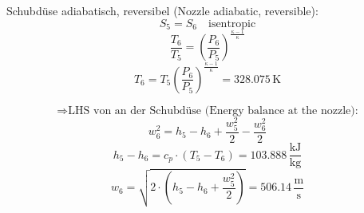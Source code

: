 Schubdüse adiabatisch, reversibel (Nozzle adiabatic, reversible):  
\[
S_5 = S_6 \quad \text{isentropic}
\]  
\[
\frac{T_6}{T_5} = \left(\frac{P_6}{P_5}\right)^{\frac{\kappa - 1}{\kappa}}
\]  
\[
T_6 = T_5 \left(\frac{P_6}{P_5}\right)^{\frac{\kappa - 1}{\kappa}} = 328.075 \, \text{K}
\]  

\[
\Rightarrow \text{LHS von an der Schubdüse (Energy balance at the nozzle):}
\]  
\[
w_6^2 = h_5 - h_6 + \frac{w_5^2}{2} - \frac{w_6^2}{2}
\]  
\[
h_5 - h_6 = c_p \cdot (T_5 - T_6) = 103.888 \, \frac{\text{kJ}}{\text{kg}}
\]  
\[
w_6 = \sqrt{2 \cdot (h_5 - h_6 + \frac{w_5^2}{2})} = 506.14 \, \frac{\text{m}}{\text{s}}
\]